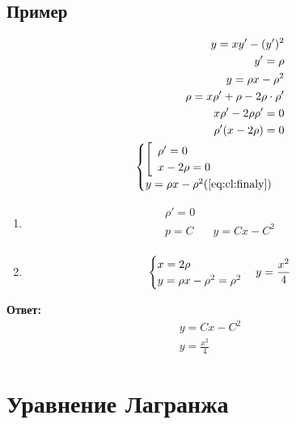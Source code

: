 \documentclass[fontsize=10pt,a4paper,fleqn]{scrreprt} %
\numberwithin{equation}{section}
\begin{document}
\subsection{Пример}
\begin{align}
  y = xy' - (y')^2 \\
  y' = \rho\nonumber\\
  y =  \rho x - \rho^2\label{eq:cl:finaly}\\
  \rho = x \rho' + \rho - 2\rho\cdot \rho'\nonumber\\
  x\rho' - 2\rho\rho'  = 0\nonumber\\
  \rho'(x-2\rho) = 0\nonumber\\
  \begin{cases}
    \left[
      \begin{array}{ll}
        \rho' = 0 \nonumber\\
        x - 2\rho = 0\nonumber\\
      \end{array}
    \right.\\
      y = \rho{}x - \rho^2 (\ref{eq:cl:finaly}) \nonumber
    \end{cases}
\end{align}
\begin{enumerate}
\item
  \begin{align}
    \rho' = 0 \nonumber\\
    p = C && y = Cx - C^2 \nonumber\\
  \end{align}
\item
  \begin{equation*}
    \begin{cases}
      x =  2\rho\\
      y = \rho{}x - \rho^2 = \rho^2
    \end{cases}\\
    y = \frac{x^2}4
  \end{equation*}
\end{enumerate}
{\bfseries Ответ:}
\begin{align*}
\boxed{y = Cx-C^2}\\
\boxed{y=\frac{x^2}4}
\end{align*}

\section{Уравнение Лагранжа}
\label{sec:lagrange}
\end{document}
